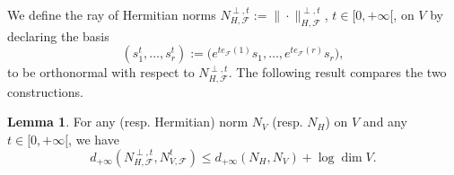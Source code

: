 \documentclass[12pt]{article}
\numberwithin{equation}{section}
\theoremstyle{theorem}
\theoremstyle{definition}
\newtheorem{lem}[thm]{Lemma}
\theoremstyle{remark}
\begin{document}
	We define the ray of Hermitian norms $N_{H, \mathcal{F}}^{\perp, t} := \| \cdot \|_{H, \mathcal{F}}^{\perp, t}$, $t \in [0, +\infty[$, on $V$ by declaring the basis 
	\begin{equation}\label{eq_bas_st}
		(s_1^t, \ldots, s_r^t) := \big( e^{t e_{\mathcal{F}}(1)} s_1, \ldots, e^{t e_{\mathcal{F}}(r)} s_r \big),
	\end{equation}
	to be orthonormal with respect to $N_{H, \mathcal{F}}^{\perp, t}$.
	The following result compares the two constructions.
	\begin{lem}\label{lem_two_norms_comp0}
		For any (resp. Hermitian) norm $N_V$ (resp. $N_H$) on $V$ and any $t \in [0, +\infty[$, we have
		\begin{equation}
			d_{+ \infty}(N_{H, \mathcal{F}}^{\perp, t}, N_{V, \mathcal{F}}^t)
			\leq
			d_{+ \infty}(N_H, N_V)
			+
			\log \dim V.
		\end{equation}
	\end{lem}
\end{document}
